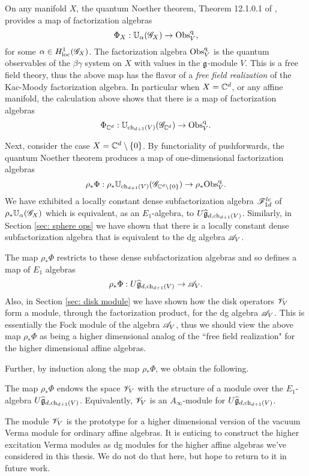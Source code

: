 \documentclass[10pt]{amsart}
\begin{document}
On any manifold $X$, the quantum Noether theorem, Theorem 12.1.0.1 of \cite{CG2}, provides a map of factorization algebras
\[
\Phi_X : \mathbb U_\alpha (\mathscr G_X) \to {\rm Obs}^{\rm q}_{V} ,
\]
for some $\alpha \in H^1_{\rm loc}(\mathscr G_X)$.
The factorization algebra ${\rm Obs}^{\rm q}_V$ is the quantum observables of the $\beta\gamma$ system on $X$ with values in the $\mathfrak g$-module $V$. 
This is a free field theory, thus the above map has the flavor of a {\em free field realization} of the Kac-Moody factorization algebra.
In particular when $X = \mathbb C^d$, or any affine manifold, the calculation above shows that there is a map of factorization algebras
\[
\Phi_{\mathbb C^d} : \mathbb U_{{\rm ch}_{d+1}(V)} (\mathscr G_{\mathbb C^d}) \to {\rm Obs}^{\rm q}_{V} .
\]

Next, consider the case $X = \mathbb C^d \setminus  \{0\}$. 
By functoriality of pushforwards, the quantum Noether theorem produces a map of one-dimensional factorization algebras
\[
\rho_* \Phi : \rho_* \mathbb U_{{\rm ch}_{d+1}(V)} (\mathscr G_{\mathbb C^d \setminus \{0\}}) \to \rho_* {\rm Obs}^{\rm q}_{V} .
\]
We have exhibited a locally constant dense subfactorization algebra $\mathscr F^{lc}_{1d}$ of $\rho_* \mathbb U_\alpha (\mathscr G_X)$ which is equivalent, as an $E_1$-algebra, to $U \widehat{\mathfrak g}_{d, {\rm ch}_{d+1}(V)}$. 
Similarly, in Section \ref{sec: sphere ops} we have shown that there is a locally constant dense subfactorization algebra that is equivalent to the dg algebra $\mathscr A_V$. 

The map $\rho_* \Phi$ restricts to these dense subfactorization algebras and so defines a map of $E_1$ algebras
\[
\rho_* \Phi : U \widehat{\mathfrak g}_{d, {\rm ch}_{d+1}(V)}\to \mathscr A_V .
\]
Also, in Section \ref{sec: disk module} we have shown how the disk operators $\mathscr V_V$ form a module, through the factorization product, for the dg algebra $\mathscr A_V$. 
This is essentially the Fock module of the algebra $\mathscr A_V$, thus we should view the above map $\rho_*\Phi$ as being a higher dimensional analog of the ``free field realization" for the higher dimensional affine algebras. 

Further, by induction along the map $\rho_* \Phi$, we obtain the following.

\begin{prop}
The map $\rho_*\Phi$ endows the space $\mathscr V_V$ with the structure of a module over the $E_1$-algebra $U \widehat{\mathfrak g}_{d, {\rm ch}_{d+1}(V)}$.
Equivalently, $\mathscr V_V$ is an $A_\infty$-module for $U \widehat{\mathfrak g}_{d, {\rm ch}_{d+1}(V)}$. 
\end{prop}

The module $\mathscr V_V$ is the prototype for a higher dimensional version of the vacuum Verma module for ordinary affine algebras. 
It is enticing to construct the higher excitation Verma modules as dg modules for the higher affine algebras we've considered in this thesis.
We do not do that here, but hope to return to it in future work.
\end{document}
